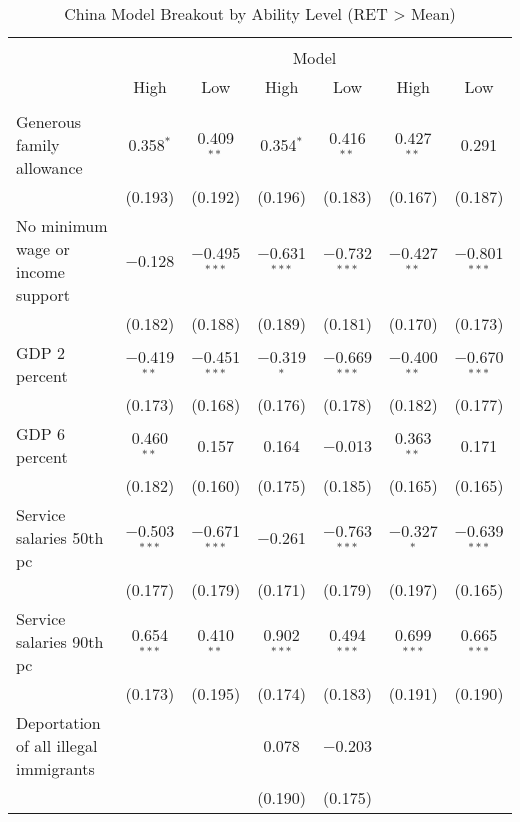 
\begin{sidewaystable}[!htbp] \centering 
  \caption{China Model Breakout by Ability Level (RET > Mean)} 
  \label{tab:china_ability} 
\begin{tabular}{@{\extracolsep{5pt}}lcccccc} 
\\[-1.8ex]\hline 
\hline \\[-1.8ex] 
 & \multicolumn{6}{c}{Model} \\ 
\cline{2-7} 
 & High & Low & High & Low & High & Low \\ 
\hline \\[-1.8ex] 
 Generous family allowance & 0.358$^{*}$ & 0.409$^{**}$ & 0.354$^{*}$ & 0.416$^{**}$ & 0.427$^{**}$ & 0.291 \\ 
  & (0.193) & (0.192) & (0.196) & (0.183) & (0.167) & (0.187) \\ 
  No minimum wage or income support & $-$0.128 & $-$0.495$^{***}$ & $-$0.631$^{***}$ & $-$0.732$^{***}$ & $-$0.427$^{**}$ & $-$0.801$^{***}$ \\ 
  & (0.182) & (0.188) & (0.189) & (0.181) & (0.170) & (0.173) \\ 
  GDP 2 percent & $-$0.419$^{**}$ & $-$0.451$^{***}$ & $-$0.319$^{*}$ & $-$0.669$^{***}$ & $-$0.400$^{**}$ & $-$0.670$^{***}$ \\ 
  & (0.173) & (0.168) & (0.176) & (0.178) & (0.182) & (0.177) \\ 
  GDP 6 percent & 0.460$^{**}$ & 0.157 & 0.164 & $-$0.013 & 0.363$^{**}$ & 0.171 \\ 
  & (0.182) & (0.160) & (0.175) & (0.185) & (0.165) & (0.165) \\ 
  Service salaries 50th pc & $-$0.503$^{***}$ & $-$0.671$^{***}$ & $-$0.261 & $-$0.763$^{***}$ & $-$0.327$^{*}$ & $-$0.639$^{***}$ \\ 
  & (0.177) & (0.179) & (0.171) & (0.179) & (0.197) & (0.165) \\ 
  Service salaries 90th pc & 0.654$^{***}$ & 0.410$^{**}$ & 0.902$^{***}$ & 0.494$^{***}$ & 0.699$^{***}$ & 0.665$^{***}$ \\ 
  & (0.173) & (0.195) & (0.174) & (0.183) & (0.191) & (0.190) \\ 
  Deportation of all illegal immigrants &  &  & 0.078 & $-$0.203 &  &  \\ 
  &  &  & (0.190) & (0.175) &  &  \\ 

\end{tabular}
\end{sidewaystable}
